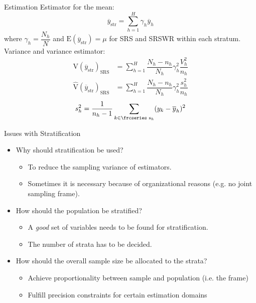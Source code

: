 \documentclass[10pt]{beamer}\usepackage[]{graphicx}\usepackage[]{color}
\newcommand{\textfrc}[1]{{\frcseries#1}}
\newcommand{\mathfrc}[1]{\text{\textfrc{#1}}}
\newcommand{\E}[1]{\text{E}\left(#1\right)}
\newcommand{\V}[1]{\text{V}\left(#1\right)}
\newcommand{\Vest}[1]{\widehat{\text{V}}\left(#1\right)}
\begin{document}
\begin{frame}{Estimation}
  Estimator for the mean:
  \begin{equation*}
  \overline{y}_{\text{str}} = \sum_{h=1}^H \gamma_h \overline{y}_h
  \end{equation*}
  where $\gamma_h = \dfrac{N_h}{N}$ and $\E{\overline{y}_{\text{str}}} = \mu$ for SRS and SRSWR within each stratum.
  \newline
  Variance and variance estimator:
  \begin{align*}
  \V{\overline{y}_{\text{str}}}_{\text{SRS}} & = \sum_{h=1}^H \dfrac{N_h-n_h}{N_h} \gamma_h^2 \dfrac{V_{h}^2}{n_h} \\
  \Vest{\overline{y}_{\text{str}}}_{\text{SRS}} & = \sum_{h=1}^H \dfrac{N_h-n_h}{N_h} \gamma_h^2 \dfrac{s_{h}^2}{n_h} 
  \end{align*}
  \begin{equation*}
  s^2_{h} = \dfrac{1}{n_h-1} \sum_{k \in \mathfrc{s}_h} (y_k - \overline{y}_h)^2
  \end{equation*}

\end{frame}


\begin{frame}{Issues with Stratification}
\begin{itemize}
\item<1-> Why should stratification be used?
\begin{itemize}
\item<2-> To reduce the sampling variance of estimators.
\item<2-> Sometimes it is necessary because of organizational reasons (e.g. no joint sampling frame).
\end{itemize}
\item<3-> How should the population be stratified?
\begin{itemize}
\item<4-> A \emph{good} set of variables needs to be found for stratification.
\item<4-> The number of strata has to be decided.
\end{itemize}
\item<6-> How should the overall sample size be allocated to the strata?
\begin{itemize}
\item<7-> Achieve proportionality between sample and population (i.e. the frame)
\item<7-> Fulfill precision constraints for certain estimation domains
\end{itemize}
\end{itemize}

\end{frame}
\end{document}

